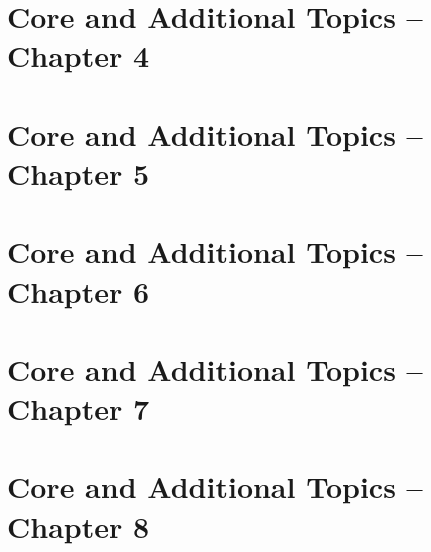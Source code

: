 \documentclass[12pt, fleqn, openany, oneside]{studyGuide}
\begin{document}
\chapter{Core and Additional Topics -- Chapter 4}








\chapter{Core and Additional Topics -- Chapter 5}







\chapter{Core and Additional Topics -- Chapter 6}









\chapter{Core and Additional Topics -- Chapter 7}








\chapter{Core and Additional Topics -- Chapter 8}







\end{document}
